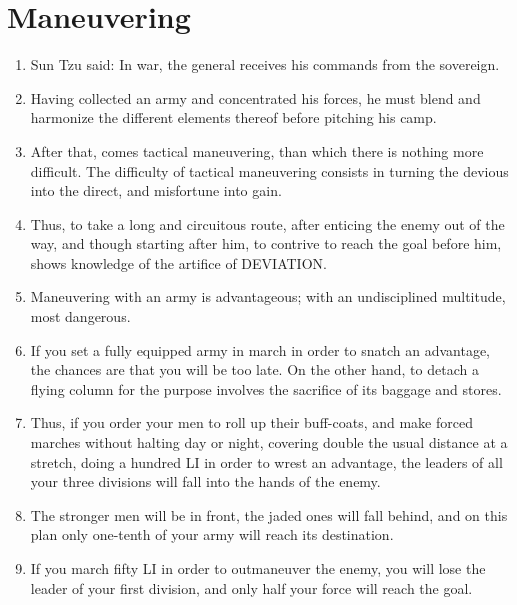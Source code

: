 \addtocounter{chapter}{1}\chapter*{Maneuvering}
\begin{enumerate}
  
\item Sun Tzu said:  In war, the general receives his
    commands from the sovereign.

  \item Having collected an army and concentrated his forces, he must
    blend and harmonize the different elements thereof before pitching
    his camp.

  \item After that, comes tactical maneuvering, than which there is
    nothing more difficult. The difficulty of tactical maneuvering
    consists in turning the devious into the direct, and misfortune
    into gain.

  \item Thus, to take a long and circuitous route, after enticing the
    enemy out of the way, and though starting after him, to contrive
    to reach the goal before him, shows knowledge of the artifice of
    DEVIATION.

  \item Maneuvering with an army is advantageous; with an
    undisciplined multitude, most dangerous.

  \item If you set a fully equipped army in march in order to snatch
    an advantage, the chances are that you will be too late. On the
    other hand, to detach a flying column for the purpose involves the
    sacrifice of its baggage and stores.

  \item Thus, if you order your men to roll up their buff-coats, and
    make forced marches without halting day or night, covering double
    the usual distance at a stretch, doing a hundred LI in order to
    wrest an advantage, the leaders of all your three divisions will
    fall into the hands of the enemy.

  \item The stronger men will be in front, the jaded ones will fall
    behind, and on this plan only one-tenth of your army will reach
    its destination.

  \item If you march fifty LI in order to outmaneuver the enemy, you
    will lose the leader of your first division, and only half your
    force will reach the goal.


\end{enumerate}
